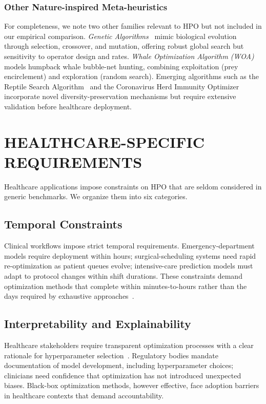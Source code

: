 \documentclass[letterpaper, 10 pt, conference]{ieeeconf}
\begin{document}
\subsubsection{Other Nature-inspired Meta-heuristics}

For completeness, we note two other families relevant to HPO but not included in our empirical comparison. \emph{Genetic Algorithms}~\cite{raji2022} mimic biological evolution through selection, crossover, and mutation, offering robust global search but sensitivity to operator design and rates. \emph{Whale Optimization Algorithm (WOA)}~\cite{nadimi2023} models humpback whale bubble-net hunting, combining exploitation (prey encirclement) and exploration (random search). Emerging algorithms such as the Reptile Search Algorithm~\cite{abualigah2022} and the Coronavirus Herd Immunity Optimizer~\cite{albetar2021} incorporate novel diversity-preservation mechanisms but require extensive validation before healthcare deployment.

\section{HEALTHCARE-SPECIFIC REQUIREMENTS}
\label{sec:healthcare}

Healthcare applications impose constraints on HPO that are seldom considered in generic benchmarks. We organize them into six categories.

\subsection{Temporal Constraints}

Clinical workflows impose strict temporal requirements. Emergency-department models require deployment within hours; surgical-scheduling systems need rapid re-optimization as patient queues evolve; intensive-care prediction models must adapt to protocol changes within shift durations. These constraints demand optimization methods that complete within minutes-to-hours rather than the days required by exhaustive approaches~\cite{naik2022}.

\subsection{Interpretability and Explainability}

Healthcare stakeholders require transparent optimization processes with a clear rationale for hyperparameter selection~\cite{naik2022}. Regulatory bodies mandate documentation of model development, including hyperparameter choices; clinicians need confidence that optimization has not introduced unexpected biases. Black-box optimization methods, however effective, face adoption barriers in healthcare contexts that demand accountability.
\end{document}
